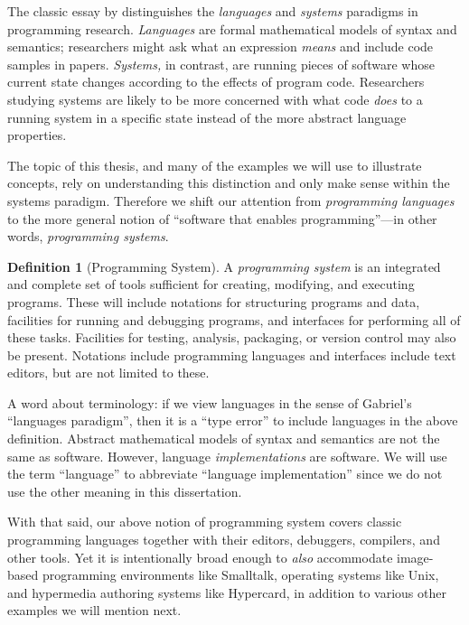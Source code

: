 \documentclass[ twoside,openright,titlepage,numbers=noenddot,headinclude,footinclude,cleardoublepage=empty,abstract=on,
                BCOR=5mm,paper=a4,fontsize=11pt
                ]{scrreprt}
\theoremstyle{definition}
\newtheorem{defn}{Definition}
\begin{document}
The classic essay by \textcite{PLrev} distinguishes the \emph{languages}
and \emph{systems} paradigms in programming research. \emph{Languages}
are formal mathematical models of syntax and semantics; researchers
might ask what an expression \emph{means} and include code samples in
papers. \emph{Systems,} in contrast, are running pieces of software
whose current state changes according to the effects of program code.
Researchers studying systems are likely to be more concerned with what
code \emph{does} to a running system in a specific state instead of the
more abstract language properties.

The topic of this thesis, and many of the examples we will use to
illustrate concepts, rely on understanding this distinction and only
make sense within the systems paradigm. Therefore we shift our attention
from \emph{programming languages} to the more general notion of
``software that enables programming''---in other words,
\emph{programming systems}.

\begin{defn}[Programming System]
\label{def:programming-system}
A \emph{programming system} is an integrated and complete set of tools sufficient for creating, modifying, and executing programs. These will include notations for structuring programs and data, facilities for running and debugging programs, and interfaces for performing all of these tasks. Facilities for testing, analysis, packaging, or version control may also be present. Notations include programming languages and interfaces include text editors, but are not limited to these.
\end{defn}

A word about terminology: if we view languages in the sense of Gabriel's
``languages paradigm'', then it is a ``type error'' to include languages
in the above definition. Abstract mathematical models of syntax and
semantics are not the same as software. However, language
\emph{implementations} are software. We will use the term ``language''
to abbreviate ``language implementation'' since we do not use the other
meaning in this dissertation.

With that said, our above notion of programming system covers classic
programming languages together with their editors, debuggers, compilers,
and other tools. Yet it is intentionally broad enough to \emph{also}
accommodate image-based programming environments like Smalltalk,
operating systems like Unix, and hypermedia authoring systems like
Hypercard, in addition to various other examples we will mention next.
\end{document}

